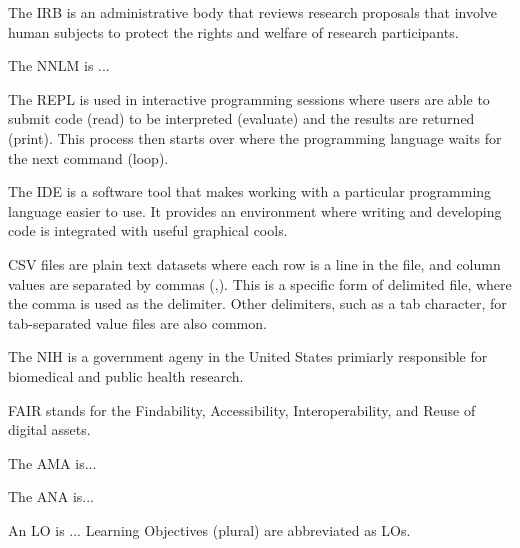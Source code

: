 \documentclass[main.tex]{subfiles}
\begin{document}

  The IRB is an administrative body that reviews research proposals that involve human subjects to protect the rights and welfare of
  research participants.


  The NNLM is ... %


  The REPL is used in interactive programming sessions where users are able to
  submit code (read) to be interpreted (evaluate) and the results are returned (print).
  This process then starts over where the programming language waits for the next command (loop).


  The IDE is a software tool that makes working with a particular programming language easier to use.
  It provides an environment where writing and developing code is integrated with useful
  graphical cools.


  CSV files are plain text datasets where each row is a line in the file,
  and column values are separated by commas (,).
  This is a specific form of delimited file, where the comma is used as the delimiter.
  Other delimiters, such as a tab character, for tab-separated value files are also common.


  The NIH is a government ageny in the United States primiarly responsible for biomedical and public health research.


  FAIR stands for the Findability, Accessibility, Interoperability, and Reuse of digital assets.


  The AMA is...


  The ANA is...


  An LO is ...
  Learning Objectives (plural) are abbreviated as LOs.

\end{document}
